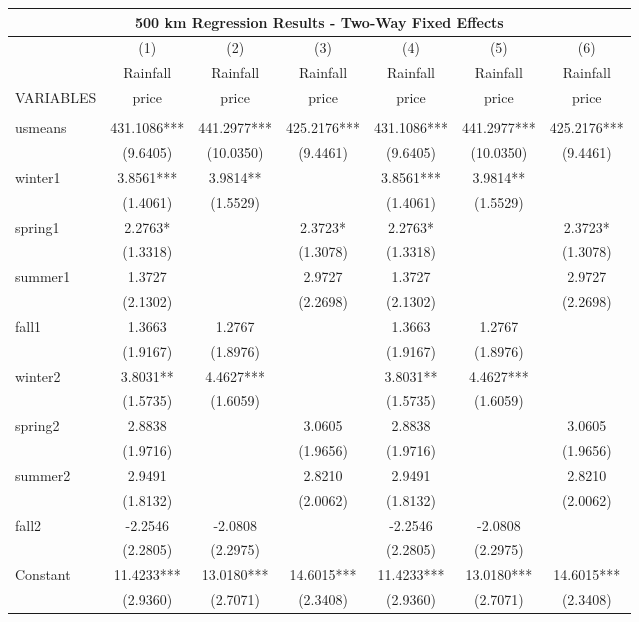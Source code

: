 \documentclass[]{article}
\begin{document}
\begin{tabular}{lcccccc}
\multicolumn{7}{c}{\huge 500 km Regression Results - Two-Way Fixed Effects} \\ \hline
 & (1) & (2) & (3) & (4) & (5) & (6) \\
 & \Large Rainfall & \Large Rainfall & \Large Rainfall & \Large Rainfall & \Large Rainfall & \Large Rainfall \\
VARIABLES & price & price & price & price & price & price \\ \hline
 &  &  &  &  &  &  \\
usmeans & 431.1086*** & 441.2977*** & 425.2176*** & 431.1086*** & 441.2977*** & 425.2176*** \\
 & (9.6405) & (10.0350) & (9.4461) & (9.6405) & (10.0350) & (9.4461) \\
winter1 & 3.8561*** & 3.9814** &  & 3.8561*** & 3.9814** &  \\
 & (1.4061) & (1.5529) &  & (1.4061) & (1.5529) &  \\
spring1 & 2.2763* &  & 2.3723* & 2.2763* &  & 2.3723* \\
 & (1.3318) &  & (1.3078) & (1.3318) &  & (1.3078) \\
summer1 & 1.3727 &  & 2.9727 & 1.3727 &  & 2.9727 \\
 & (2.1302) &  & (2.2698) & (2.1302) &  & (2.2698) \\
fall1 & 1.3663 & 1.2767 &  & 1.3663 & 1.2767 &  \\
 & (1.9167) & (1.8976) &  & (1.9167) & (1.8976) &  \\
winter2 & 3.8031** & 4.4627*** &  & 3.8031** & 4.4627*** &  \\
 & (1.5735) & (1.6059) &  & (1.5735) & (1.6059) &  \\
spring2 & 2.8838 &  & 3.0605 & 2.8838 &  & 3.0605 \\
 & (1.9716) &  & (1.9656) & (1.9716) &  & (1.9656) \\
summer2 & 2.9491 &  & 2.8210 & 2.9491 &  & 2.8210 \\
 & (1.8132) &  & (2.0062) & (1.8132) &  & (2.0062) \\
fall2 & -2.2546 & -2.0808 &  & -2.2546 & -2.0808 &  \\
 & (2.2805) & (2.2975) &  & (2.2805) & (2.2975) &  \\
Constant & 11.4233*** & 13.0180*** & 14.6015*** & 11.4233*** & 13.0180*** & 14.6015*** \\
 & (2.9360) & (2.7071) & (2.3408) & (2.9360) & (2.7071) & (2.3408) \\

\end{tabular}
\end{document}
